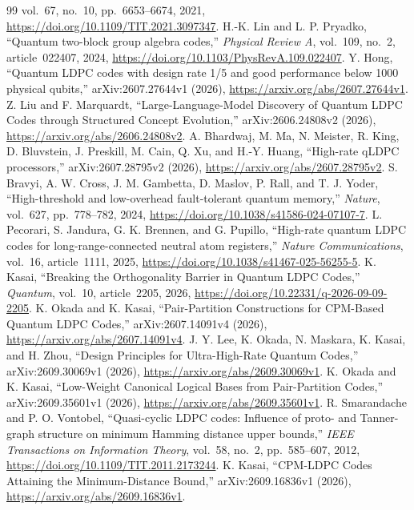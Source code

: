 \begin{thebibliography}{99}
vol.~67, no.~10, pp.~6653--6674, 2021,
\url{https://doi.org/10.1109/TIT.2021.3097347}.
H.-K. Lin and L. P. Pryadko,
``Quantum two-block group algebra codes,'' \emph{Physical Review A},
vol.~109, no.~2, article~022407, 2024,
\url{https://doi.org/10.1103/PhysRevA.109.022407}.
Y. Hong, ``Quantum LDPC codes with design rate 1/5 and good
performance below 1000 physical qubits,'' arXiv:2607.27644v1 (2026),
\url{https://arxiv.org/abs/2607.27644v1}.
Z. Liu and F. Marquardt, ``Large-Language-Model Discovery of
Quantum LDPC Codes through Structured Concept Evolution,''
arXiv:2606.24808v2 (2026), \url{https://arxiv.org/abs/2606.24808v2}.
A. Bhardwaj, M. Ma, N. Meister, R. King, D. Bluvstein,
J. Preskill, M. Cain, Q. Xu, and H.-Y. Huang,
``High-rate qLDPC processors,'' arXiv:2607.28795v2 (2026),
\url{https://arxiv.org/abs/2607.28795v2}.
S. Bravyi, A. W. Cross, J. M. Gambetta, D. Maslov,
P. Rall, and T. J. Yoder, ``High-threshold and low-overhead fault-tolerant
quantum memory,'' \emph{Nature}, vol.~627, pp.~778--782, 2024,
\url{https://doi.org/10.1038/s41586-024-07107-7}.
L. Pecorari, S. Jandura, G. K. Brennen, and G. Pupillo,
``High-rate quantum LDPC codes for long-range-connected neutral atom
registers,'' \emph{Nature Communications}, vol.~16, article~1111, 2025,
\url{https://doi.org/10.1038/s41467-025-56255-5}.
K. Kasai, ``Breaking the Orthogonality Barrier in Quantum
LDPC Codes,'' \emph{Quantum}, vol.~10, article~2205, 2026,
\url{https://doi.org/10.22331/q-2026-09-09-2205}.
K. Okada and K. Kasai, ``Pair-Partition Constructions for
CPM-Based Quantum LDPC Codes,'' arXiv:2607.14091v4 (2026),
\url{https://arxiv.org/abs/2607.14091v4}.
J. Y. Lee, K. Okada, N. Maskara, K. Kasai, and H. Zhou,
``Design Principles for Ultra-High-Rate Quantum Codes,''
arXiv:2609.30069v1 (2026), \url{https://arxiv.org/abs/2609.30069v1}.
K. Okada and K. Kasai, ``Low-Weight Canonical Logical
Bases from Pair-Partition Codes,'' arXiv:2609.35601v1 (2026),
\url{https://arxiv.org/abs/2609.35601v1}.
R. Smarandache and P. O. Vontobel, ``Quasi-cyclic LDPC
codes: Influence of proto- and Tanner-graph structure on minimum Hamming
distance upper bounds,'' \emph{IEEE Transactions on Information Theory},
vol.~58, no.~2, pp.~585--607, 2012,
\url{https://doi.org/10.1109/TIT.2011.2173244}.
K. Kasai, ``CPM-LDPC Codes Attaining the Minimum-Distance
Bound,'' arXiv:2609.16836v1 (2026),
\url{https://arxiv.org/abs/2609.16836v1}.

\end{thebibliography}
